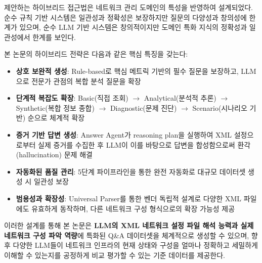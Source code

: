 \documentclass[twocolumn, 10pt]{article}
\begin{document}
제안하는 하이브리드 접근법은 네트워크 관리 도메인의 특성을 반영하여 설계되었다.
순수 규칙 기반 시스템은 일관성과 정확성은 보장하지만 질문의 다양성과 창의성에
한계가 있으며, 순수 LLM 기반 시스템은 창의적이지만 도메인 특화 지식의 정확성과
일관성에서 한계를 보인다.

본 논문의 하이브리드 전략은 다음과 같은 핵심 특징을 갖는다:

\begin{itemize}
\item \textbf{상호 보완적 생성}: Rule-based로 핵심 메트릭 기반의 필수 질문을
  보장하고, LLM으로 전문가 관점의 복합 분석 질문을 확장

\item \textbf{단계적 복잡도 확장}: Basic(직접 조회) $\rightarrow$ Analytical(분석적
  추론) $\rightarrow$ Synthetic(복합 정보 종합) $\rightarrow$ Diagnostic(문제
  진단) $\rightarrow$ Scenario(시나리오 기반) 순으로 체계적 확장

\item \textbf{증거 기반 답변 생성}: Answer Agent가 reasoning plan을 실행하여
  XML 설정으로부터 실제 증거를 수집한 후 LLM이 이를 바탕으로 답변을 합성함으로써
  환각(hallucination) 문제 해결

\item \textbf{자동화된 품질 관리}: 5단계 파이프라인을 통한 완전 자동화로 대규모
  데이터셋 생성 시 일관성 보장

\item \textbf{범용성과 확장성}: Universal Parser를 통한 벤더 독립적 설계로 다양한
  XML 파일에도 유효하게 동작하며, 다른 네트워크 구성 형식으로의 확장 가능성
  제공
\end{itemize}

이러한 설계를 통해 본 논문은 \textbf{LLM의 XML 네트워크 설정 파일 해석 능력과
실제 네트워크 구성 파악 역량}에 특화된 Q\&A 데이터셋을 체계적으로 생성할 수
있으며, 향후 다양한 LLM들이 네트워크 인프라의 현재 상태와 구성을 얼마나 정확하고
세밀하게 이해할 수 있는지를 공정하게 비교 평가할 수 있는 기준 데이터를 제공한다.
\end{document}
